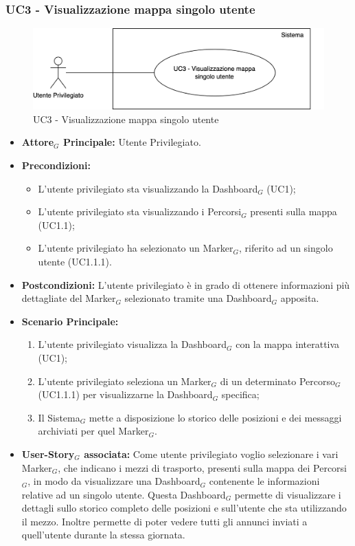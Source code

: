 \documentclass[10pt]{article}
\begin{document}
\begin{justify}
\subsubsection{\textbf{UC3 - Visualizzazione mappa singolo utente}}
\begin{figure}[H]
    \centering
    \includegraphics[width=0.7\linewidth]{UC3image.png}
    \caption{UC3 - Visualizzazione mappa singolo utente}
    \label{fig:UC3}
\end{figure}
    \label{UC3}
\begin{itemize}
     \item \textbf{Attore$_G$ Principale:} Utente Privilegiato.
     \item \textbf{Precondizioni:}
        \begin{itemize}
    		\item L'utente privilegiato sta visualizzando la Dashboard$_G$ (UC1);
    	        \item L'utente privilegiato sta visualizzando i Percorsi$_G$ presenti sulla mappa (UC1.1);
    	        \item L'utente privilegiato ha selezionato un Marker$_G$, riferito ad un singolo utente (UC1.1.1).
        \end{itemize}
     \item \textbf{Postcondizioni:} L'utente privilegiato è in grado di ottenere informazioni più dettagliate del Marker$_G$ selezionato tramite una Dashboard$_G$ apposita.
     \item \textbf{Scenario Principale:}
        \begin{enumerate}
            \item L'utente privilegiato visualizza la Dashboard$_G$ con la mappa interattiva (UC1);
            \item L'utente privilegiato seleziona un Marker$_G$ di un determinato Percorso$_G$ (UC1.1.1) per visualizzarne la Dashboard$_G$ specifica;
            \item Il Sistema$_G$ mette a disposizione lo storico delle posizioni e dei messaggi archiviati per quel Marker$_G$.
        \end{enumerate}
     \item \textbf{User-Story$_G$ associata:}
     Come utente privilegiato voglio selezionare i vari Marker$_G$, che indicano i mezzi di trasporto, presenti sulla mappa dei Percorsi$_G$, in modo da visualizzare una Dashboard$_G$ contenente le informazioni relative ad un singolo utente. Questa Dashboard$_G$ permette di visualizzare i dettagli sullo storico completo delle posizioni e sull'utente che sta utilizzando il mezzo. Inoltre permette di poter vedere tutti gli annunci inviati a quell'utente durante la stessa giornata.
\end{itemize}


\end{justify}
\end{document}
